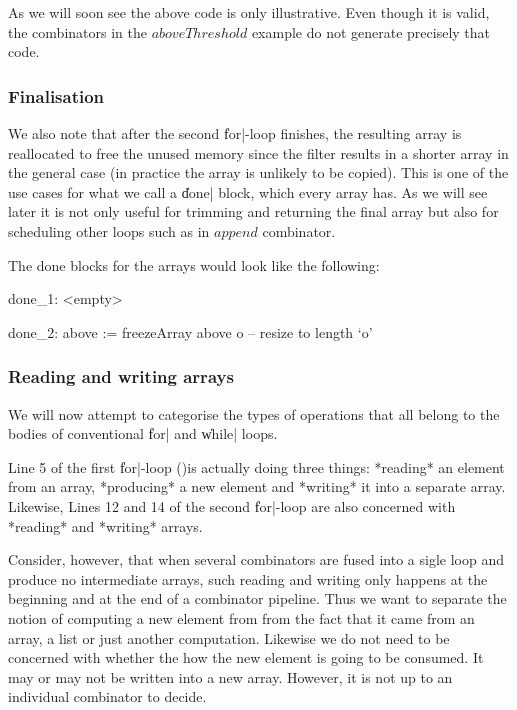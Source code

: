 \documentclass[preamble.tex]{subfiles}
\begin{document}
As we will soon see the above code is only illustrative. Even though it is valid, the combinators in the $aboveThreshold$ example do not generate precisely that code.

\subsubsection{Finalisation}
We also note that after the second \|for|-loop finishes, the resulting array is reallocated to free the unused memory since the filter results in a shorter array in the general case (in practice the array is unlikely to be copied). This is one of the use cases for what we call a \|done| block, which every array has. As we will see later it is not only useful for trimming and returning the final array but also for scheduling other loops such as in $append$ combinator.

The done blocks for the arrays would look like the following:

\begin{loopcode}
  done_1:
    <empty>

  done_2:
    above := freezeArray above o  -- resize to length `o'
\end{loopcode}

\subsubsection{Reading and writing arrays}
We will now attempt to categorise the types of operations that all belong to the bodies of conventional \|for| and \|while| loops.

Line 5 of the first \|for|-loop ()is actually doing three things: *reading* an element from an array, *producing* a new element and *writing* it into a separate array. Likewise, Lines 12 and 14 of the second \|for|-loop are also concerned with *reading* and *writing* arrays.

Consider, however, that when several combinators are fused into a sigle loop and produce no intermediate arrays, such reading and writing only happens at the beginning and at the end of a combinator pipeline. Thus we want to separate the notion of computing a new element from from the fact that it came from an array, a list or just another computation. Likewise we do not need to be concerned with whether the how the new element is going to be consumed. It may or may not be written into a new array. However, it is not up to an individual combinator to decide.
\end{document}
